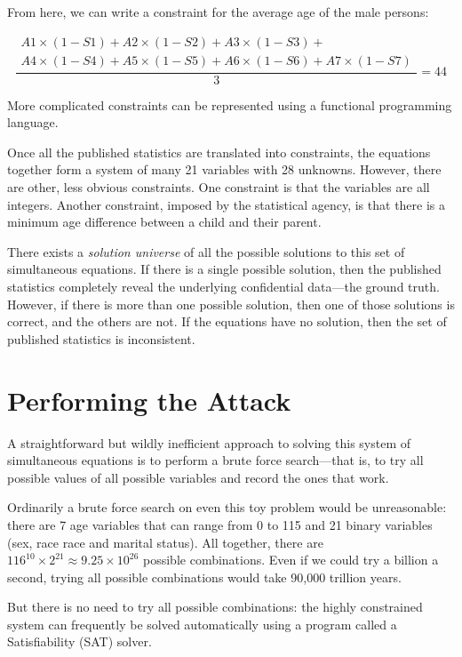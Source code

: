 \documentclass[runningheads]{llncs}
\begin{document}
From here, we can write a constraint for the average age of the male persons:

\begin{equation}
\frac{
  \begin{split}
  A1 \times (1-S1) + A2 \times (1-S2) + A3 \times (1-S3) + \\
   A4 \times (1-S4) + A5 \times (1-S5) + A6 \times (1-S6) + A7 \times (1-S7)
  \end{split}
}{3} = 44
\end{equation}

More complicated constraints can be represented using a functional
programming language. 


Once all the published statistics
are translated into constraints, the equations together form a
system of many 21 variables with 28 unknowns. However, there are
other, less obvious constraints. One constraint is that the variables
are all integers. Another constraint, imposed by the statistical
agency, is that there is a minimum age difference between a child and
their parent.

There exists a \textit{solution universe} of all the possible solutions to
this set of simultaneous equations. If there is a single possible
solution, then the published statistics completely reveal the
underlying confidential data---the ground truth. However, if
there is more than one possible solution, then one of those solutions
is correct, and the others are not. If the equations have no solution,
then the set of published statistics is inconsistent.

\section{Performing the Attack}
A straightforward but wildly inefficient approach to solving this
system of simultaneous equations is to perform a brute force
search---that is, to try all possible values of all possible variables
and record the ones that work.

Ordinarily a brute force search on even this toy problem would be
unreasonable: there are 7 age variables that can range from 0 to 115
and 21 binary variables (sex, race race and marital status). All
together, there are $116^{10} \times 2^{21} \approx 9.25
\times 10^{26}$ possible combinations. Even if we could try a billion
a second, trying all possible combinations would take 90,000 trillion
years. 

But there is no need to try all possible combinations: the highly
constrained system can frequently be solved automatically using a
program called a Satisfiability (SAT) solver. 
\end{document}
